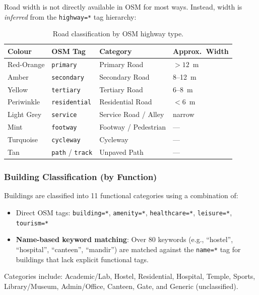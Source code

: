 \documentclass[12pt, a4paper]{article}
\begin{document}
Road width is not directly available in OSM for most ways. Instead, 
width is \emph{inferred} from the \texttt{highway=*} tag hierarchy:

\begin{table}[H]
\centering
\caption{Road classification by OSM highway type.}
\label{tab:roads}
\begin{tabular}{@{}llll@{}}
\toprule
\textbf{Colour} & \textbf{OSM Tag} & \textbf{Category} & \textbf{Approx.\ Width} \\
\midrule
Red-Orange & \texttt{primary} & Primary Road & $>12$~m \\
Amber & \texttt{secondary} & Secondary Road & 8--12~m \\
Yellow & \texttt{tertiary} & Tertiary Road & 6--8~m \\
Periwinkle & \texttt{residential} & Residential Road & $<6$~m \\
Light Grey & \texttt{service} & Service Road / Alley & narrow \\
Mint & \texttt{footway} & Footway / Pedestrian & --- \\
Turquoise & \texttt{cycleway} & Cycleway & --- \\
Tan & \texttt{path} / \texttt{track} & Unpaved Path & --- \\
\bottomrule
\end{tabular}
\end{table}

\subsubsection{Building Classification (by Function)}

Buildings are classified into 11 functional categories using a 
combination of:
\begin{itemize}
    \item Direct OSM tags: \texttt{building=*}, \texttt{amenity=*}, 
    \texttt{healthcare=*}, \texttt{leisure=*}, \texttt{tourism=*}
    \item \textbf{Name-based keyword matching}: Over 80 keywords 
    (e.g., ``hostel'', ``hospital'', ``canteen'', ``mandir'') are 
    matched against the \texttt{name=*} tag for buildings that lack 
    explicit functional tags.
\end{itemize}

Categories include: Academic/Lab, Hostel, Residential, Hospital, 
Temple, Sports, Library/Museum, Admin/Office, Canteen, Gate, and 
Generic (unclassified).
\end{document}
